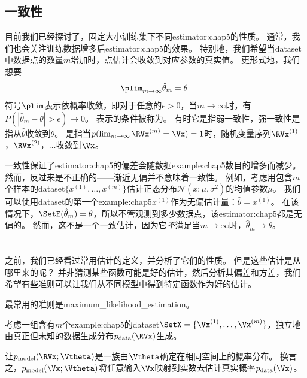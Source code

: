 \subsection{一致性}
\label{sec:consistency}
目前我们已经探讨了，固定大小训练集下不同\gls{estimator:chap5}的性质。
通常，我们也会关注训练数据增多后\gls{estimator:chap5}的效果。
特别地，我们希望当\gls{dataset}中数据点的数量$m$增加时，点估计会收敛到对应参数的真实值。
更形式地，我们想要
\begin{equation}
\label{eq:5.55}
    \plim_{m\to\infty} \hat{\theta}_m = \theta.
\end{equation}
符号$\plim$表示依概率收敛，即对于任意的$\epsilon > 0$，当$m\to\infty$时，有$P(|\hat{\theta}_m - \theta| > \epsilon) \to 0$。
表示的条件被称为。
有时它是指弱一致性，强一致性是指从$\hat{\theta}$收敛到$\theta$。
是指当$p(\lim_{m\to\infty} \RVx^{(m)} = \Vx) = 1 $时，随机变量序列$\RVx^{(1)}$，$\RVx^{(2)}$，$\dots$收敛到$\Vx$。

一致性保证了\gls{estimator:chap5}的偏差会随数据\gls{example:chap5}数目的增多而减少。
然而，反过来是不正确的——渐近无偏并不意味着一致性。
例如，考虑用包含$m$个样本的\gls{dataset}$\{x^{(1)},\dots,x^{(m)}\}$估计正态分布$\mathcal{N}(x;\mu,\sigma^2)$的均值参数$\mu$。
我们可以使用\gls{dataset}的第一个\gls{example:chap5}$x^{(1)}$作为无偏估计量：$\hat{\theta} = x^{(1)}$。
在该情况下，$\SetE(\hat{\theta}_m) = \theta$，所以不管观测到多少数据点，该\gls{estimator:chap5}都是无偏的。
然而，这不是一个一致估计，因为它\emph{不}满足当$m\to\infty$时，$\hat{\theta}_m \to \theta$。


\section{}
\label{sec:maximum_likelihood_estimation}
之前，我们已经看过常用估计的定义，并分析了它们的性质。
但是这些估计是从哪里来的呢？
并非猜测某些函数可能是好的估计，然后分析其偏差和方差，我们希望有些准则可以让我们从不同模型中得到特定函数作为好的估计。

最常用的准则是\gls{maximum_likelihood_estimation}。

考虑一组含有$m$个\gls{example:chap5}的\gls{dataset}$\SetX=\{ \Vx^{(1)},\dots, \Vx^{(m)} \}$，独立地由真正但未知的数据生成分布$p_{\text{data}}(\RVx)$生成。

让$p_{\text{model}}( \RVx; \Vtheta )$是一族由$\Vtheta$确定在相同空间上的概率分布。
换言之，$p_{\text{model}}(\Vx;\Vtheta)$将任意输入$\Vx$映射到实数去估计真实概率$p_{\text{data}}(\Vx)$。

